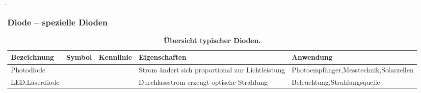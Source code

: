 \begin{frame}
    \b{
        \frametitle{Diode -- spezielle Dioden}
        \begin{table}[H]
            \centering 
            \begin{tabular}{ |p{2.1cm}|p{1.4cm}|p{3.2cm}|p{2.8cm}|p{3cm}| }
                \hline
                \textbf{Bezeichnung} & \textbf{Symbol} & \textbf{Kennlinie} & \textbf{Eigenschaften} & \textbf{Anwendung} \\
                \hline
                Photo\-diode
                &
                \begin{minipage}[t][2.6cm][c]{1.4cm}
                    \centering 
                \end{minipage}
                & 
                \begin{minipage}[t][2.6cm][c]{3.3cm}
                    \centering 
                \end{minipage}
                & 
                Strom ändert sich proportional zur Lichtleistung &
                Photoempfänger,\newline Messtechnik,\newline Solarzellen\\
                \hline
                LED,\newline Laserdiode
                &
                \begin{minipage}[t][2.6cm][c]{1.4cm}
                    \centering 
                \end{minipage}
                & 
                \begin{minipage}[t][2.6cm][c]{3.3cm}
                    \centering 
                \end{minipage}
                & 
                Durchlassstrom erzeugt optische Strahlung &
                Beleuchtung,\newline Strahlungsquelle\\
                \hline
            \end{tabular}
            \caption{\textbf{Übersicht typischer Dioden.}}
        \end{table}
    }

\end{frame}

